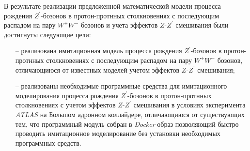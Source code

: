
В результате реализации предложенной математической модели процесса рождения ${Z}^{\prime}$-бозонов в протон-протнных столкновениях с последующим распадом на пару ${W}^{+}{W}^{-}$ бозонов и учета эффектов $Z$-${Z}^{\prime}$ смешивания были достигнуты следующие цели: 
\begin{enumerate}
	\item[--] реализована имитационная модель процесса рождения ${Z}^{\prime}$-бозонов в протон-протнных столкновениях с последующим распадом на пару ${W}^{+}{W}^{-}$ бозонов, отличающиюся от известных моделей учетом эффектов $Z$-${Z}^{\prime}$ смешивания;
	\item[--] реализованы необходимые программные средства для имитационного моделирования процесса
	рождения ${Z}^{\prime}$-бозонов в протон-протнных столкновениях с учетом эффектов $Z$-${Z}^{\prime}$ смешивания в условиях эксперимента \textit{ATLAS} на Большом адронном коллайдере, отличающиюся от существующих тем, что программный модуль собран в \textit{Docker} образ позволяющий быстро проводить имитационное моделирование без установки необходимых программных средств.
\end{enumerate}
